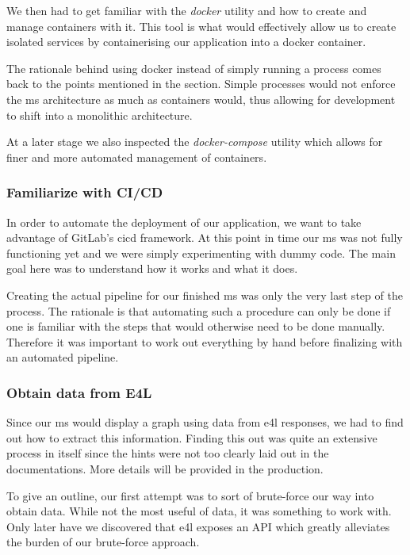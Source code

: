 We then had to get familiar with the \textit{docker} utility and how
to create and manage containers with it. This tool is what would
effectively allow us to create isolated services by containerising our
application into a docker container.

The rationale behind using docker instead of simply running a process
comes back to the points mentioned in the
 section. Simple processes would not
enforce the \gls{ms} architecture as much as containers would, thus
allowing for development to shift into a monolithic architecture.

At a later stage we also inspected the \textit{docker-compose}
utility which allows for finer and more automated management of
containers.

\subsubsection{Familiarize with CI/CD}

In order to automate the deployment of our application, we want to
take advantage of GitLab's \gls{cicd} framework. At this point in time
our \gls{ms} was not fully functioning yet and we were simply
experimenting with dummy code. The main goal here was to understand
how it works and what it does.

Creating the actual pipeline for our finished \gls{ms} was only the
very last step of the process. The rationale is that automating such a
procedure can only be done if one is familiar with the steps that
would otherwise need to be done manually. Therefore it was important
to work out everything by hand before finalizing with an automated
pipeline.

\subsubsection{Obtain data from E4L}

Since our \gls{ms} would display a graph using data from \gls{e4l}
responses, we had to find out how to extract this information. Finding
this out was quite an extensive process in itself since the hints were
not too clearly laid out in the documentations. More details will be
provided in the production.

To give an outline, our first attempt was to sort of brute-force our way
into obtain data. While not the most useful of data, it was something
to work with. Only later have we discovered that \gls{e4l} exposes an
API which greatly alleviates the burden of our brute-force approach.

